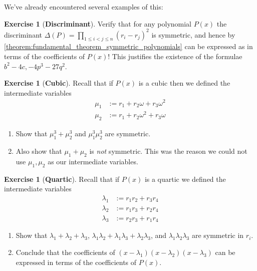 \documentclass[reqno, 12pt, letter]{article}
\theoremstyle{plain}
\theoremstyle{definition}
\newtheorem{exercise}[theorem]{Exercise}
\theoremstyle{remark}
\numberwithin{equation}{section}
\begin{document}
	We've already encountered several examples of this:
	\begin{exercise}[\textbf{Discriminant}]
		Verify that for any polynomial $ P(x)$ the discriminant $\Delta(P) = \prod_{1 \leq i < j \leq n} (r_i - r_j)^2$ is symmetric, and hence by \autoref{theorem:fundamental_theorem_symmetric_polynomials} can be expressed as in terms of the coefficients of $ P(x)$! This justifies the existence of the formulae $ b^2 - 4c, -4p^3 - 27q^2$.
	\end{exercise}
	
	\begin{exercise}[\textbf{Cubic}] Recall that if $ P(x)$ is a cubic then we defined the intermediate variables \begin{align*}
    \mu_1 &:= r_1 + r_2 \omega + r_3 \omega^2 \\
    \mu_2 &:= r_1 + r_2 \omega^2 + r_3 \omega
  \end{align*}
		\begin{enumerate}
			\item Show that $ \mu_1^3 + \mu_2^3 $ and $ \mu_1^3  \mu_2^3$ are symmetric. 
			\item Also show that $ \mu_1 + \mu_2$ is \emph{not} symmetric.  This was the reason we could not use $ \mu_1, \mu_2$ as our intermediate variables.
		\end{enumerate}
	\end{exercise}
	
	\begin{exercise}[\textbf{Quartic}]
		\label{exercise:quartic-lambda}
		Recall that if $ P(x)$ is a quartic we defined the intermediate variables
		\begin{align*}
				\lambda_1 &:= r_1 r_2 + r_3 r_4 \\
				\lambda_2 &:= r_1 r_3 + r_2 r_4 \\
				\lambda_3 &:= r_2 r_3 + r_1 r_4 
		\end{align*}
			\begin{enumerate}
			\item Show that $ \lambda_1 + \lambda_2 + \lambda_3$, $ \lambda_1 \lambda_2 + \lambda_1 \lambda_3 + \lambda_2 \lambda_3$, and $ \lambda_1 \lambda_2 \lambda_3$ are symmetric in $r_i$. 
			\item Conclude that the coefficients of $ (x-\lambda_1)(x-\lambda_2)(x-\lambda_3)$ can be expressed in terms of the coefficients of $ P(x)$.
		\end{enumerate}
	\end{exercise}
	
\end{document}
